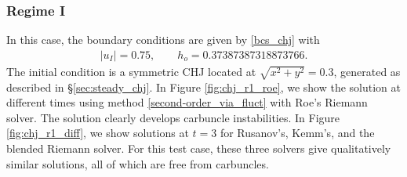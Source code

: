 \documentclass[preprint, 11pt]{article}
\newcommand{\bfu}{{u}}
\begin{document}
\subsubsection{Regime I}
In this case, the boundary conditions are given by \eqref{bcs_chj} with
\begin{align}\label{bcs_chj_r1}
  |\bfu_I|=0.75, \qquad h_o=0.37387387318873766. 
\end{align}
The initial condition is a symmetric CHJ located at $\sqrt{x^2+y^2}=0.3$, generated as described in \S \ref{sec:steady_chj}.
In Figure \ref{fig:chj_r1_roe}, we show the solution at different times using
method \eqref{second-order_via_fluct} with Roe's Riemann solver.
The solution clearly develops carbuncle instabilities.
In Figure \ref{fig:chj_r1_diff}, we show solutions at $t=3$ for
Rusanov's, Kemm's, and the blended Riemann solver.
For this test case, these three solvers give qualitatively similar solutions,
all of which are free from carbuncles.
\end{document}
